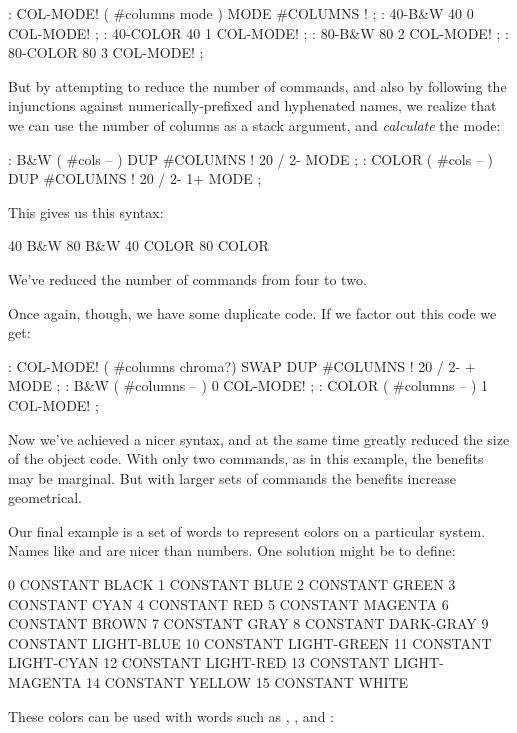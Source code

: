 \begin{Code}
: COL-MODE!     ( #columns mode )  MODE  #COLUMNS ! ;
: 40-B&W       40 0 COL-MODE! ;
: 40-COLOR     40 1 COL-MODE! ;
: 80-B&W       80 2 COL-MODE! ;
: 80-COLOR     80 3 COL-MODE! ;
\end{Code}
But by attempting to reduce the number of commands, and also by
following the injunctions against numerically-prefixed and hyphenated
names, we realize that we can use the number of columns as a stack
argument, and \emph{calculate} the mode:

\begin{Code}
: B&W    ( #cols -- )  DUP #COLUMNS !  20 /  2-     MODE ;
: COLOR  ( #cols -- )  DUP #COLUMNS !  20 /  2-  1+ MODE ;
\end{Code}
This gives us this syntax:

\begin{Code}
40 B&W
80 B&W
40 COLOR
80 COLOR
\end{Code}
We've reduced the number of commands from four to two.

Once again, though, we have some duplicate code. If we factor out this
code we get:

\begin{Code}
: COL-MODE!  ( #columns chroma?)
   SWAP DUP #COLUMNS !  20 / 2-  +  MODE ;
: B&W    ( #columns -- )  0 COL-MODE! ;
: COLOR  ( #columns -- )  1 COL-MODE! ;
\end{Code}
Now we've achieved a nicer syntax, and at the same time greatly
reduced the size of the object code. With only two commands, as in
this example, the benefits may be marginal. But with larger sets of
commands the benefits increase geometrical.

Our final example is a set of words to represent colors on a
particular system. Names like  and  are nicer
than numbers. One solution might be to define:

\begin{Code}
 0 CONSTANT BLACK                 1 CONSTANT BLUE
 2 CONSTANT GREEN                 3 CONSTANT CYAN
 4 CONSTANT RED                   5 CONSTANT MAGENTA
 6 CONSTANT BROWN                 7 CONSTANT GRAY
 8 CONSTANT DARK-GRAY             9 CONSTANT LIGHT-BLUE
10 CONSTANT LIGHT-GREEN          11 CONSTANT LIGHT-CYAN
12 CONSTANT LIGHT-RED            13 CONSTANT LIGHT-MAGENTA
14 CONSTANT YELLOW               15 CONSTANT WHITE
\end{Code}
These colors can be used with words such as ,
, and :

